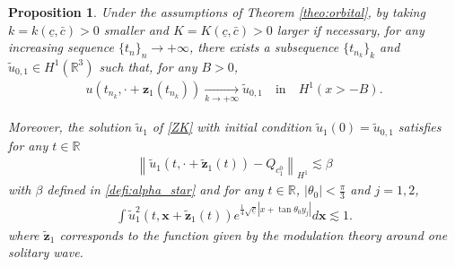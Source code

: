 \documentclass[reqno,10pt]{amsart}
\newtheorem{propo}[lemm]{Proposition}
\numberwithin{equation}{section}
\newcommand{\bx}{\mathbf{x}}
\newcommand{\bz}{\mathbf{z}}
\begin{document}
       \begin{propo}\label{propo:limit_object_1_3d}
		Under the assumptions of Theorem \ref{theo:orbital}, by taking $k=k(\underline{c},\bar{c})>0$ smaller and $K=K(\underline{c},\bar{c})>0$ larger if necessary, for any increasing sequence $\{t_n\}_n\rightarrow +\infty$, there exists a subsequence $\{t_{n_k}\}_k$ and $\tilde{u}_{0,1}\in H^1(\mathbb{R}^3)$ such that, for any $B>0$,
		\begin{align*}
			u \left( t_{n_k}, \cdot + \bz_1(t_{n_k}) \right) \underset{k\rightarrow +\infty}{\rightarrow} \tilde{u}_{0,1} \quad \text{in} \quad H^1(x >-B).
		\end{align*}
		
		Moreover, the solution $\tilde{u}_1$ of \ref{ZK} with initial condition $\tilde{u}_1(0)= \tilde{u}_{0,1}$ satisfies for any $t \in \mathbb{R}$
		\begin{align}\label{eq:u_tilde1_bound_3d}
			\left\| \tilde{u}_1 \left(t,\cdot + \tilde{\bz}_1(t) \right) - Q_{c_1^0} \right\|_{H^1} \lesssim \beta
		\end{align}
		with $\beta$ defined in \eqref{defi:alpha_star} and for any $t \in \mathbb R$, $|\theta_0| < \frac{\pi}3$ and $j=1,2$,
		\begin{align}\label{eq:u_tilde1_decay_3d}
			\int \tilde{u}_1^2  \left( t, \bx + \tilde{\bz}_1(t) \right) e^{\frac14\sqrt{\underline{c}}|x+\tan{\theta_0}y_j|} d\bx \lesssim 1. 
		\end{align}
		where $\tilde{\bz}_1$ corresponds to the function given by the modulation theory around one solitary wave. 
	\end{propo}
\end{document}
